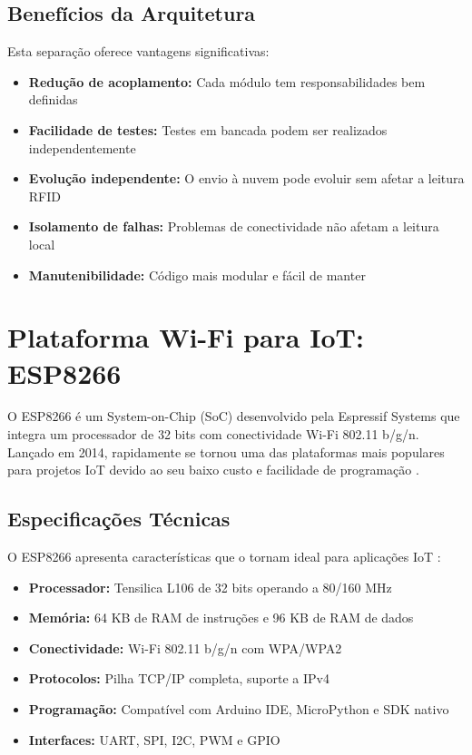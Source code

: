 \subsection{Benefícios da Arquitetura}

Esta separação oferece vantagens significativas:

\begin{itemize}
\item \textbf{Redução de acoplamento:} Cada módulo tem responsabilidades bem definidas
\item \textbf{Facilidade de testes:} Testes em bancada podem ser realizados independentemente
\item \textbf{Evolução independente:} O envio à nuvem pode evoluir sem afetar a leitura RFID
\item \textbf{Isolamento de falhas:} Problemas de conectividade não afetam a leitura local
\item \textbf{Manutenibilidade:} Código mais modular e fácil de manter
\end{itemize}

\section{Plataforma Wi-Fi para IoT: ESP8266}
\label{sec:esp8266-wifi}

O ESP8266 é um System-on-Chip (SoC) desenvolvido pela Espressif Systems que integra um processador de 32 bits com conectividade Wi-Fi 802.11 b/g/n. Lançado em 2014, rapidamente se tornou uma das plataformas mais populares para projetos IoT devido ao seu baixo custo e facilidade de programação \cite{makerhero-esp8266,embarcados-serial}.

\subsection{Especificações Técnicas}

O ESP8266 apresenta características que o tornam ideal para aplicações IoT \cite{espressif-esp8266}:

\begin{itemize}
\item \textbf{Processador:} Tensilica L106 de 32 bits operando a 80/160 MHz
\item \textbf{Memória:} 64 KB de RAM de instruções e 96 KB de RAM de dados
\item \textbf{Conectividade:} Wi-Fi 802.11 b/g/n com WPA/WPA2
\item \textbf{Protocolos:} Pilha TCP/IP completa, suporte a IPv4
\item \textbf{Programação:} Compatível com Arduino IDE, MicroPython e SDK nativo
\item \textbf{Interfaces:} UART, SPI, I2C, PWM e GPIO
\end{itemize}

